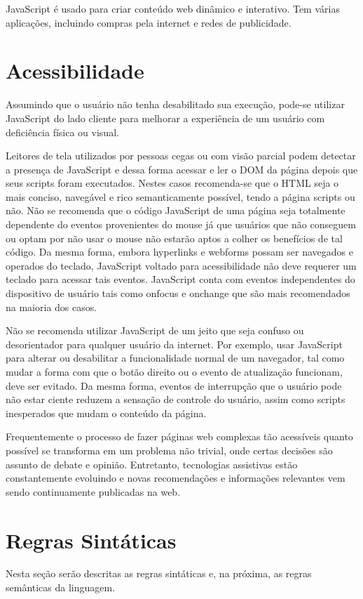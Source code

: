 \documentclass[
	article,			%
	11pt,				%
	oneside,			%
	a4paper,			%
	english,			%
	brazil,				%
	]{abntex2}
\begin{document}
        JavaScript é usado para criar conteúdo web dinâmico e interativo. Tem várias aplicações, incluindo compras pela internet e redes de publicidade.
    
    \section{Acessibilidade}
        Assumindo que o usuário não tenha desabilitado sua execução, pode-se utilizar JavaScript do lado cliente para melhorar a experiência de um usuário com deficiência física ou visual.
    
        Leitores de tela utilizados por pessoas cegas ou com visão parcial podem detectar a presença de JavaScript e dessa forma acessar e ler o DOM da página depois que seus scripts foram executados. Nestes casos recomenda-se que o HTML seja o mais conciso, navegável e rico semanticamente possível, tendo a página scripts ou não. Não se recomenda que o código JavaScript de uma página seja totalmente dependente do eventos provenientes do mouse já que usuários que não conseguem ou optam por não usar o mouse não estarão aptos a colher os benefícios de tal código. Da mesma forma, embora hyperlinks e webforms possam ser navegados e operados do teclado, JavaScript voltado para acessibilidade não deve requerer um teclado para acessar tais eventos. JavaScript conta com eventos independentes do dispositivo de usuário tais como onfocus e onchange que são mais recomendados na maioria dos casos.
    
        Não se recomenda utilizar JavaScript de um jeito que seja confuso ou desorientador para qualquer usuário da internet. Por exemplo, usar JavaScript para alterar ou desabilitar a funcionalidade normal de um navegador, tal como mudar a forma com que o botão direito ou o evento de atualização funcionam, deve ser evitado. Da mesma forma, eventos de interrupção que o usuário pode não estar ciente reduzem a sensação de controle do usuário, assim como scripts inesperados que mudam o conteúdo da página.
    
        Frequentemente o processo de fazer páginas web complexas tão acessíveis quanto possível se transforma em um problema não trivial, onde certas decisões são assunto de debate e opinião. Entretanto, tecnologias assistivas estão constantemente evoluindo e novas recomendações e informações relevantes vem sendo continuamente publicadas na web.

    \section{Regras Sintáticas}
        Nesta seção serão descritas as regras sintáticas e, na próxima, as regras semânticas da linguagem\cite{crockford2008javascript}.
    
\end{document}
